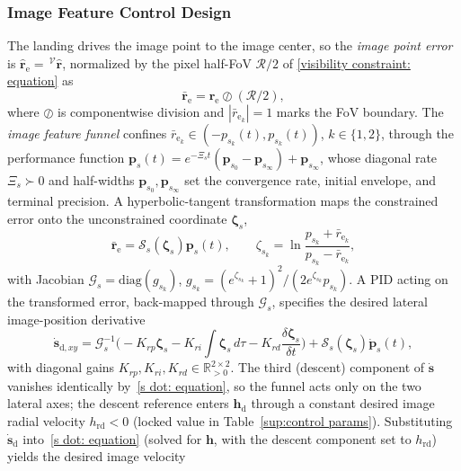 \documentclass{IEEEtaes}
\begin{document}
\subsubsection{Image Feature Control Design} \label{image point control: section}
The landing drives the image point to the image center, so the \emph{image point error} is $\hat{\boldsymbol{r}}_\text{e}=\,^\mathcal{V}\hat{\boldsymbol{r}}$, normalized by the pixel half-FoV $\mathcal{R}/2$ of \eqref{visibility constraint: equation} as
\begin{equation} \label{normalized error: equation}
    \bar{\boldsymbol{r}}_\text{e} = \hat{\boldsymbol{r}}_\text{e}\oslash(\mathcal{R}/2),
\end{equation}
where $\oslash$ is componentwise division and $|\bar{r}_{\text{e}_k}|=1$ marks the FoV boundary. The \emph{image feature funnel} confines $\bar{r}_{\text{e}_k}\in(-p_{s_k}(t),p_{s_k}(t))$, $k\in\{1,2\}$, through the performance function $\boldsymbol{p}_s(t)=e^{-\Xi_s t}(\boldsymbol{p}_{s_0}-\boldsymbol{p}_{s_\infty})+\boldsymbol{p}_{s_\infty}$, whose diagonal rate $\Xi_s\succ 0$ and half-widths $\boldsymbol{p}_{s_0},\boldsymbol{p}_{s_\infty}$ set the convergence rate, initial envelope, and terminal precision. A hyperbolic-tangent transformation maps the constrained error onto the unconstrained coordinate $\boldsymbol{\zeta}_s$,
\begin{equation} \label{image funnel transform: equation}
    \bar{\boldsymbol{r}}_\text{e}=\mathcal{S}_s(\boldsymbol{\zeta}_s)\boldsymbol{p}_s(t),\qquad \zeta_{s_k}=\ln\!\frac{p_{s_k}+\bar{r}_{\text{e}_k}}{p_{s_k}-\bar{r}_{\text{e}_k}},
\end{equation}
with Jacobian $\mathcal{G}_s=\mathrm{diag}(g_{s_k})$, $g_{s_k}=(e^{\zeta_{s_k}}+1)^2/(2e^{\zeta_{s_k}}p_{s_k})$. A PID acting on the transformed error, back-mapped through $\mathcal{G}_s$, specifies the desired lateral image-position derivative
\begin{equation} \label{s_e_dot_d: equation}
    \dot{\boldsymbol{s}}_{\text{d},xy} = \mathcal{G}_s^{-1}\!\Big(\!-K_{rp}\boldsymbol{\zeta}_s - K_{ri}\!\int\boldsymbol{\zeta}_s\,d\tau - K_{rd}\frac{\delta\boldsymbol{\zeta}_s}{\delta t}\Big) + \mathcal{S}_s(\boldsymbol{\zeta}_s)\dot{\boldsymbol{p}}_s(t),
\end{equation}
with diagonal gains $K_{rp},K_{ri},K_{rd}\in\mathbb{R}^{2\times 2}_{>0}$. The third (descent) component of $\dot{\boldsymbol{s}}$ vanishes identically by~\eqref{s dot: equation}, so the funnel acts only on the two lateral axes; the descent reference enters $\boldsymbol{h}_\text{d}$ through a constant desired image radial velocity $h_\text{rd}<0$ (locked value in Table~\ref{sup:control params}). Substituting $\dot{\boldsymbol{s}}_\text{d}$ into~\eqref{s dot: equation} (solved for $\boldsymbol{h}$, with the descent component set to $h_\text{rd}$) yields the desired image velocity
\end{document}
